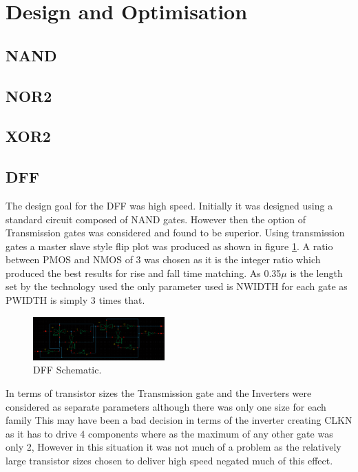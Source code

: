 \section{Design and Optimisation} 


\subsection{NAND}

\subsection{NOR2}

\subsection{XOR2}

\subsection{DFF}
The design goal for the DFF was high speed. Initially it was designed using a standard circuit composed of NAND gates. However then the option of Transmission gates was considered and found to be superior. Using transmission gates a master slave style flip plot was produced as shown in figure \ref{fig:DFFSchem}. A ratio between PMOS and NMOS of 3 was chosen as it is the integer ratio which produced the best results for rise and fall time matching. As 0.35$\mu$ is the length set by the technology used the only parameter used is NWIDTH for each gate as PWIDTH is simply 3 times that.

\begin{figure}[h]  
\centering
   \includegraphics[width=0.45\textwidth]{Figures/DFFSchem.png}
\caption{DFF Schematic.}
\label {fig:DFFSchem}
\end{figure}

In terms of transistor sizes the Transmission gate and the Inverters were considered as separate parameters although there was only one size for each family This may have been a bad decision in terms of the inverter creating CLKN as it has to drive 4 components where as the maximum of any other gate was only 2, However in this situation it was not much of a problem as the relatively large transistor sizes chosen to deliver high speed negated much of this effect.

